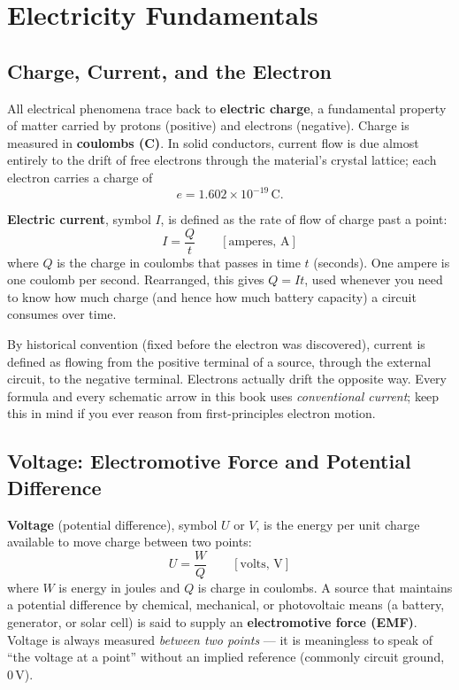 \chapter{Electricity Fundamentals}
\label{ch:electricity}

\section{Charge, Current, and the Electron}

All electrical phenomena trace back to \textbf{electric charge}, a
fundamental property of matter carried by protons (positive) and
electrons (negative). Charge is measured in \textbf{coulombs (C)}. In
solid conductors, current flow is due almost entirely to the drift of
free electrons through the material's crystal lattice; each electron
carries a charge of
\[
e = 1.602 \times 10^{-19}\,\text{C}.
\]

\textbf{Electric current}, symbol $I$, is defined as the rate of flow of
charge past a point:
\[
I = \frac{Q}{t} \qquad [\text{amperes, A}]
\]
where $Q$ is the charge in coulombs that passes in time $t$ (seconds). One
ampere is one coulomb per second. Rearranged, this gives $Q = It$, used
whenever you need to know how much charge (and hence how much battery
capacity) a circuit consumes over time.

\begin{keyidea}
By historical convention (fixed before the electron was discovered),
current is defined as flowing from the positive terminal of a source,
through the external circuit, to the negative terminal. Electrons
actually drift the opposite way. Every formula and every schematic
arrow in this book uses \emph{conventional current}; keep this in mind
if you ever reason from first-principles electron motion.
\end{keyidea}

\section{Voltage: Electromotive Force and Potential Difference}

\textbf{Voltage} (potential difference), symbol $U$ or $V$, is the energy
per unit charge available to move charge between two points:
\[
U = \frac{W}{Q} \qquad [\text{volts, V}]
\]
where $W$ is energy in joules and $Q$ is charge in coulombs. A source that
maintains a potential difference by chemical, mechanical, or
photovoltaic means (a battery, generator, or solar cell) is said to
supply an \textbf{electromotive force (EMF)}. Voltage is always measured
\emph{between two points} --- it is meaningless to speak of ``the voltage
at a point'' without an implied reference (commonly circuit ground, 0\,V).

